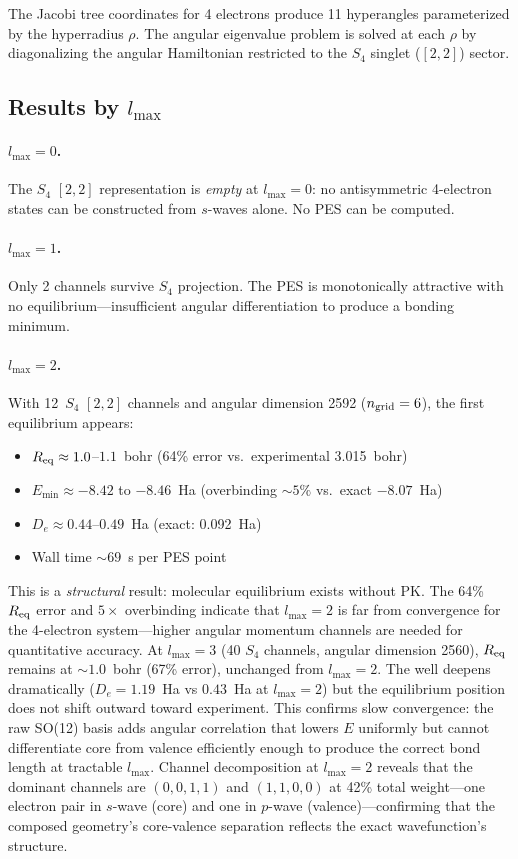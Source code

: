 \documentclass[aps,pra,twocolumn,superscriptaddress,longbibliography,floatfix]{revtex4-2}
\begin{document}
The Jacobi tree coordinates for 4 electrons produce 11 hyperangles
parameterized by the hyperradius $\rho$.  The angular eigenvalue
problem is solved at each $\rho$ by diagonalizing the angular
Hamiltonian restricted to the $S_4$ singlet ($[2,2]$) sector.

\subsection{Results by $l_{\max}$}

\paragraph{$l_{\max} = 0$.}
The $S_4$ $[2,2]$ representation is \emph{empty} at $l_{\max} = 0$:
no antisymmetric 4-electron states can be constructed from $s$-waves
alone.  No PES can be computed.

\paragraph{$l_{\max} = 1$.}
Only 2 channels survive $S_4$ projection.  The PES is monotonically
attractive with no equilibrium---insufficient angular differentiation
to produce a bonding minimum.

\paragraph{$l_{\max} = 2$.}
With 12~$S_4$ $[2,2]$ channels and angular dimension 2592
($n_{\rm grid} = 6$), the first equilibrium appears:
\begin{itemize}
  \item $R_{\rm eq} \approx 1.0$--$1.1$~bohr (64\% error vs.\
    experimental 3.015~bohr)
  \item $E_{\min} \approx -8.42$ to $-8.46$~Ha (overbinding
    ${\sim}5\%$ vs.\ exact $-8.07$~Ha)
  \item $D_e \approx 0.44$--$0.49$~Ha (exact: 0.092~Ha)
  \item Wall time ${\sim}69$~s per PES point
\end{itemize}

This is a \emph{structural} result: molecular equilibrium exists
without PK.  The 64\% $R_{\rm eq}$ error and $5{\times}$ overbinding
indicate that $l_{\max} = 2$ is far from convergence for the
4-electron system---higher angular momentum channels are needed for
quantitative accuracy.  At $l_{\max} = 3$ (40 $S_4$ channels,
angular dimension 2560), $R_{\rm eq}$ remains at ${\sim}1.0$~bohr
(67\% error), unchanged from $l_{\max} = 2$.  The well deepens
dramatically ($D_e = 1.19$~Ha vs $0.43$~Ha at $l_{\max} = 2$) but the
equilibrium position does not shift outward toward experiment.  This
confirms slow convergence: the raw SO(12) basis adds angular
correlation that lowers $E$ uniformly but cannot differentiate core
from valence efficiently enough to produce the correct bond length at
tractable $l_{\max}$.  Channel decomposition at $l_{\max} = 2$ reveals
that the dominant channels are $(0,0,1,1)$ and $(1,1,0,0)$ at 42\%
total weight---one electron pair in $s$-wave (core) and one in
$p$-wave (valence)---confirming that the composed geometry's
core-valence separation reflects the exact wavefunction's structure.
\end{document}
